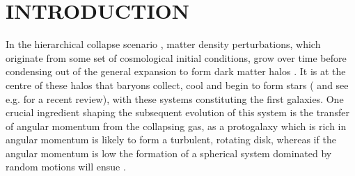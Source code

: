 \documentclass[fleqn,usenatbib]{mn2e}
\begin{document}


\section{INTRODUCTION}

In the hierarchical collapse scenario \citep{Rees1977,Fall1980}, matter density perturbations, which originate from some set of cosmological initial conditions, grow over time before condensing out of the general expansion to form dark matter halos \cite{Silk1968,Peebles1970}.
It is at the centre of these halos that baryons collect, cool and begin to form stars (\cite{Birnboim2003,Keres2005,Dekel2006} and see e.g. \cite{Mo2010} for a recent review), with these systems constituting the first galaxies.
One crucial ingredient shaping the subsequent evolution of this system is the transfer of angular momentum from the collapsing gas, as a protogalaxy which is rich in angular momentum is likely to form a turbulent, rotating disk, whereas if the angular momentum is low the formation of a spherical system dominated by random motions will ensue \citep[e.g.][]{Fall1983}. 
\end{document}
